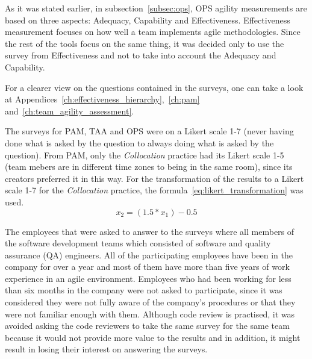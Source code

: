 
As it was stated earlier, in subsection~\ref{subsec:ops}, \ac{OPS} agility measurements are based on three aspects: Adequacy, Capability and Effectiveness. Effectiveness measurement focuses on how well a team implements agile methodologies. Since the rest of the tools focus on the same thing, it was decided only to use the survey from Effectiveness and not to take into account the Adequacy and Capability.

For a clearer view on the questions contained in the surveys, one can take a look at Appendices~\ref{ch:effectiveness_hierarchy},~\ref{ch:pam} and~\ref{ch:team_agility_assessment}.

The surveys for \ac{PAM}, \ac{TAA} and \ac{OPS} were on a Likert scale 1-7 (never having done what is asked by the question to always doing what is asked by the question). From \ac{PAM}, only the \textit{Collocation} practice had its Likert scale 1-5 (team mebers are in different time zones to being in the same room), since its creators preferred it in this way. For the transformation of the results to a Likert scale 1-7 for the \textit{Collocation} practice, the formula~\eqref{eq:likert_transformation} \cite{likert_transformation} was used.  \begin{equation} \label{eq:likert_transformation} x_2 = (1.5 * x_1) - 0.5 \end{equation} 

The employees that were asked to answer to the surveys where all members of the software development teams which consisted of software and quality assurance (QA) engineers. All of the participating employees have been in the company for over a year and most of them have more than five years of work experience in an agile environment. Employees who had been working for less than six months in the company were not asked to participate, since it was considered they were not fully aware of the company's procedures or that they were not familiar enough with them. Although code review is practised, it was avoided asking the code reviewers to take the same survey for the same team because it would not provide more value to the results and in addition, it might result in losing their interest on answering the surveys. 

